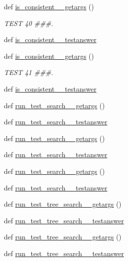 \begin{DoxyCompactItemize}
def \hyperlink{namespacetests_a4bd7fbb98193ed556209c5d06a9d4a74}{is\+\_\+consistent\+\_\+\_\+getargs} ()
\begin{DoxyCompactList}\small\item\em T\+E\+S\+T 40 \#\#\#. \end{DoxyCompactList}\item 
def \hyperlink{namespacetests_a4f6f0e670a3170f8578d10611d4ee635}{is\+\_\+consistent\+\_\+\_\+testanswer}
\item 
def \hyperlink{namespacetests_a3479cdaac4bfe49e907e1d2729e76f1a}{is\+\_\+consistent\+\_\+\_\+getargs} ()
\begin{DoxyCompactList}\small\item\em T\+E\+S\+T 41 \#\#\#. \end{DoxyCompactList}\item 
def \hyperlink{namespacetests_aeb030be9fc4e4e682b08d2aedf34213d}{is\+\_\+consistent\+\_\+\_\+testanswer}
\item 
def \hyperlink{namespacetests_a826270996d90cc98a3649e52d4037e44}{run\+\_\+test\+\_\+search\+\_\+\_\+getargs} ()
\item 
def \hyperlink{namespacetests_a7b2bfa2e8fba006dc081b3f36d33a62d}{run\+\_\+test\+\_\+search\+\_\+\_\+testanswer}
\item 
def \hyperlink{namespacetests_a4c3cf4e80e5a34ce576ff1d8b36b38e5}{run\+\_\+test\+\_\+search\+\_\+\_\+getargs} ()
\item 
def \hyperlink{namespacetests_a24853a337329fd32b4a6410fd77a478c}{run\+\_\+test\+\_\+search\+\_\+\_\+testanswer}
\item 
def \hyperlink{namespacetests_a506a9c15bbfcfd47973f86a48506f353}{run\+\_\+test\+\_\+search\+\_\+\_\+getargs} ()
\item 
def \hyperlink{namespacetests_a214fa6f0974eda6a17112762e1441d14}{run\+\_\+test\+\_\+search\+\_\+\_\+testanswer}
\item 
def \hyperlink{namespacetests_ae41bce8c93eb0f904135b4d680d83c10}{run\+\_\+test\+\_\+tree\+\_\+search\+\_\+\_\+getargs} ()
\item 
def \hyperlink{namespacetests_ae776c70b007efcb93656732d47fc5b7f}{run\+\_\+test\+\_\+tree\+\_\+search\+\_\+\_\+testanswer}
\item 
def \hyperlink{namespacetests_a4be81ee8d709d6cad14a4c69ecc4bf73}{run\+\_\+test\+\_\+tree\+\_\+search\+\_\+\_\+getargs} ()
\item 
def \hyperlink{namespacetests_a9904ef0f79e4a1de93e6c163fcc0bf06}{run\+\_\+test\+\_\+tree\+\_\+search\+\_\+\_\+testanswer}

\end{DoxyCompactItemize}
